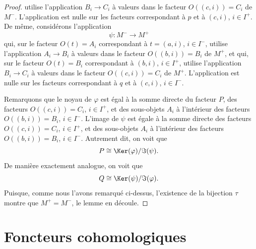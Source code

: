 \begin{proof}
utilise l'application $B_i \to C_i$ à valeurs dans le facteur $O((c, i)) = C_i$ de $M^{-}$.
L'application est nulle sur les facteurs correspondant à $p$
et à $(c, i)$, $i \in I^{+}$.
De même, considérons l'application
$$
\psi : M^{-} \longrightarrow M^{+}
$$
qui, sur le facteur $O(t) = A_i$ correspondant à $t = (a, i)$, $i \in I^{-}$,
utilise l'application $A_i \to B_i$ à valeurs dans le facteur $O((b, i)) = B_i$ de $M^{+}$,
et qui, sur le facteur $O(t) = B_i$ correspondant à $(b, i)$, $i \in I^{+}$,
utilise l'application $B_i \to C_i$ à valeurs dans le facteur $O((c, i)) = C_i$ de $M^{+}$.
L'application est nulle sur les facteurs correspondant à $q$ et à
$(c, i)$, $i \in I^{-}$.

\medskip\noindent
Remarquons que le noyau de $\varphi$ est égal à la somme directe du
facteur $P$, des facteurs $O((c, i)) = C_i$, $i \in I^{+}$, et
des sous-objets $A_i$ à l'intérieur des facteurs $O((b, i)) = B_i$, $i \in I^{-}$.
L'image de $\psi$ est égale à la somme directe des
facteurs $O((c, i)) = C_i$, $i \in I^{+}$, et
des sous-objets $A_i$ à l'intérieur des facteurs $O((b, i)) = B_i$, $i \in I^{-}$.
Autrement dit, on voit que
$$
P \cong \Ker(\varphi)/\Im(\psi).
$$
De manière exactement analogue, on voit que
$$
Q \cong \Ker(\psi)/\Im(\varphi).
$$
Puisque, comme nous l'avons remarqué ci-dessus, l'existence de la bijection
$\tau$ montre que $M^{+} = M^{-}$, le lemme en découle.
\end{proof}



\section{Foncteurs cohomologiques}
\label{section-cohomological-delta-functor}

